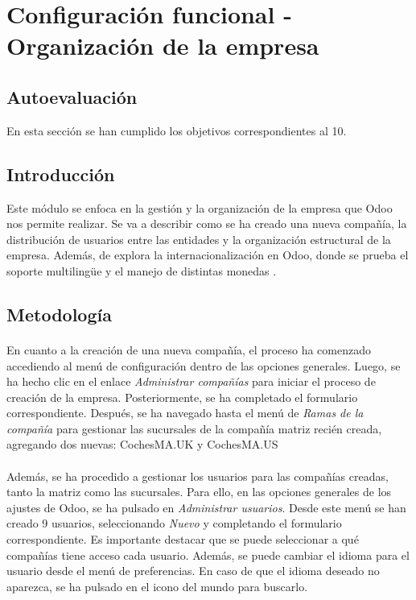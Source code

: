 \section{Configuración funcional - Organización de la empresa}
\subsection{Autoevaluación}
En esta sección se han cumplido los objetivos correspondientes al 10.
\subsection{Introducción}
Este módulo se enfoca en la gestión y la organización de la empresa que Odoo nos permite realizar. Se va a describir como se ha creado una nueva compañía, la distribución de usuarios entre las entidades y la organización estructural de la empresa. Además, de explora la internacionalización en Odoo, donde se prueba el soporte multilingüe y el manejo de distintas monedas .
\subsection{Metodología}
\paragraph{}
En cuanto a la creación de una nueva compañía, el proceso ha comenzado accediendo al menú de configuración dentro de las opciones generales. Luego, se ha hecho clic en el enlace \textit{Administrar compañías} para iniciar el proceso de creación de la empresa. Posteriormente, se ha completado el formulario correspondiente. Después, se ha navegado hasta el menú de \textit{Ramas de la compañía} para gestionar las sucursales de la compañía matriz recién creada, agregando dos nuevas: CochesMA.UK y CochesMA.US
\paragraph{}
Además, se ha procedido a gestionar los usuarios para las compañías creadas, tanto la matriz como las sucursales. Para ello, en las opciones generales de los ajustes de Odoo, se ha pulsado en \textit{Administrar usuarios}. Desde este menú se han creado 9 usuarios, seleccionando \textit{Nuevo} y completando el formulario correspondiente. Es importante destacar que se puede seleccionar a qué compañías tiene acceso cada usuario. Además, se puede cambiar el idioma para el usuario desde el menú de preferencias. En caso de que el idioma deseado no aparezca, se ha pulsado en el icono del mundo para buscarlo.
